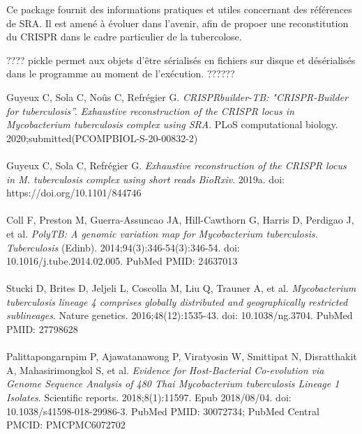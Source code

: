 \documentclass[twoside,a4paper,11pt,frenchb,openany]{report}
\begin{document}
Ce package fournit des informations pratiques et utiles concernant des références de SRA. Il est amené à évoluer dans l'avenir, afin de propoer une reconstitution du CRISPR dans le cadre particulier de la tubercolose.

	



????
pickle permet aux objets d'être sérialisés en fichiers sur disque et désérialisés dans le programme au moment de l'exécution.
??????
	


\printindex



\begin{spacing}{0.5}

\renewcommand{\bibname}{Références}
\begin{thebibliography}{10}

Guyeux C, Sola C, Noûs C, Refrégier G. \textit{CRISPRbuilder-TB:
"CRISPR-Builder for tuberculosis''. Exhaustive reconstruction of the
CRISPR locus in Mycobacterium tuberculosis complex using SRA}. PLoS
computational biology. 2020;submitted(PCOMPBIOL-S-20-00832-2)\\ \\

Guyeux C, Sola C, Refrégier G. \textit{Exhaustive reconstruction of the
CRISPR locus in M. tuberculosis complex using short reads BioRxiv}.
2019a. doi: https://doi.org/10.1101/844746\\ \\

 Coll F, Preston M, Guerra-Assuncao JA, Hill-Cawthorn G, Harris D,
Perdigao J, et al. \textit{PolyTB: A genomic variation map for Mycobacterium
tuberculosis. Tuberculosis} (Edinb). 2014;94(3):346-54(3):346-54. doi:
10.1016/j.tube.2014.02.005. PubMed PMID: 24637013\\ \\

Stucki D, Brites D, Jeljeli L, Coscolla M, Liu Q, Trauner A, et al.
\textit{Mycobacterium tuberculosis lineage 4 comprises globally distributed and
geographically restricted sublineages}. Nature genetics.
2016;48(12):1535-43. doi: 10.1038/ng.3704. PubMed PMID: 27798628\\ \\

Palittapongarnpim P, Ajawatanawong P, Viratyosin W, Smittipat N,
Disratthakit A, Mahasirimongkol S, et al. \textit{Evidence for Host-Bacterial
Co-evolution via Genome Sequence Analysis of 480 Thai Mycobacterium
tuberculosis Lineage 1 Isolates}. Scientific reports. 2018;8(1):11597.
Epub 2018/08/04. doi: 10.1038/s41598-018-29986-3. PubMed PMID: 30072734;
PubMed Central PMCID: PMCPMC6072702\\ \\


\end{thebibliography}
\end{spacing}
\end{document}
